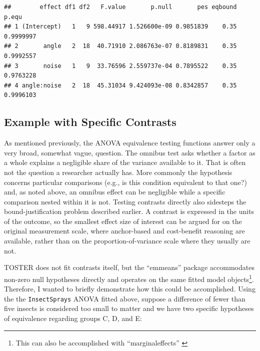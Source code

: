 \documentclass[]{interact}
\theoremstyle{plain}%
\theoremstyle{definition}
\theoremstyle{remark}
\begin{document}
\begin{verbatim}
##        effect df1 df2   F.value       p.null       pes eqbound     p.equ
## 1 (Intercept)   1   9 598.44917 1.526600e-09 0.9851839    0.35 0.9999997
## 2       angle   2  18  40.71910 2.086763e-07 0.8189831    0.35 0.9992557
## 3       noise   1   9  33.76596 2.559737e-04 0.7895522    0.35 0.9763228
## 4 angle:noise   2  18  45.31034 9.424093e-08 0.8342857    0.35 0.9996103
\end{verbatim}

\newpage

\subsection{Example with Specific
Contrasts}\label{example-with-specific-contrasts}

As mentioned previously, the ANOVA equivalence testing functions answer
only a very broad, somewhat vague, question. The omnibus test asks
whether a factor as a whole explains a negligible share of the variance
available to it. That is often not the question a researcher actually
has. More commonly the hypothesis concerns particular comparisons (e.g.,
is this condition equivalent to that one?) and, as noted above, an
omnibus effect can be negligible while a specific comparison nested
within it is not. Testing contrasts directly also sidesteps the
bound-justification problem described earlier. A contrast is expressed
in the units of the outcome, so the smallest effect size of interest can
be argued for on the original measurement scale, where anchor-based and
cost-benefit reasoning are available, rather than on the
proportion-of-variance scale where they usually are not.

TOSTER does not fit contrasts itself, but the ``emmeans'' package
\citep{emmeans} accommodates non-zero null hypotheses directly and
operates on the same fitted model objects\footnote{This can also be
  accomplished with ``marginaleffects'' \citep{marginaleffects}}.
Therefore, I wanted to briefly demonstrate how this could be
accomplished. Using the the \texttt{InsectSprays} ANOVA fitted above,
suppose a difference of fewer than five insects is considered too small
to matter and we have two specific hypotheses of equivalence regarding
groups C, D, and E:
\end{document}
